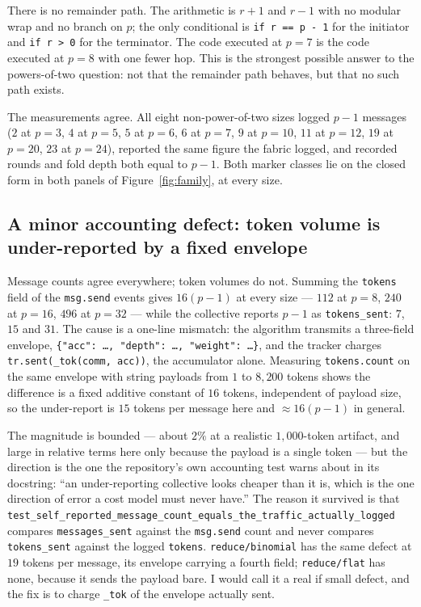 \documentclass[11pt]{article}
\begin{document}
There is no remainder path. The arithmetic is $r+1$ and $r-1$ with no modular wrap and no
branch on $p$; the only conditional is \texttt{if r == p - 1} for the initiator and
\texttt{if r > 0} for the terminator. The code executed at $p=7$ is the code executed at $p=8$
with one fewer hop. This is the strongest possible answer to the powers-of-two question: not
that the remainder path behaves, but that no such path exists.

The measurements agree. All eight non-power-of-two sizes logged $p-1$ messages ($2$ at $p=3$,
$4$ at $p=5$, $5$ at $p=6$, $6$ at $p=7$, $9$ at $p=10$, $11$ at $p=12$, $19$ at $p=20$, $23$ at
$p=24$), reported the same figure the fabric logged, and recorded rounds and fold depth both
equal to $p-1$. Both marker classes lie on the closed form in both panels of
Figure~\ref{fig:family}, at every size.

\subsection*{A minor accounting defect: token volume is under-reported by a fixed envelope}

Message counts agree everywhere; token volumes do not. Summing the \texttt{tokens} field of the
\texttt{msg.send} events gives $16(p-1)$ at every size --- $112$ at $p=8$, $240$ at $p=16$,
$496$ at $p=32$ --- while the collective reports $p-1$ as \texttt{tokens\_sent}: $7$, $15$ and
$31$. The cause is a one-line mismatch: the algorithm transmits a three-field envelope,
\texttt{\{"acc": \dots, "depth": \dots, "weight": \dots\}}, and the tracker charges
\texttt{tr.sent(\_tok(comm, acc))}, the accumulator alone. Measuring
\texttt{tokens.count} on the same envelope with string payloads from $1$ to $8{,}200$ tokens
shows the difference is a fixed additive constant of $16$ tokens, independent of payload size,
so the under-report is $15$ tokens per message here and $\approx 16(p-1)$ in general.

The magnitude is bounded --- about $2\%$ at a realistic $1{,}000$-token artifact, and large in
relative terms here only because the payload is a single token --- but the direction is the one
the repository's own accounting test warns about in its docstring: ``an under-reporting
collective looks cheaper than it is, which is the one direction of error a cost model must never
have.'' The reason it survived is that
\texttt{test\_self\_reported\_message\_count\_equals\_the\_traffic\_actually\_logged} compares
\texttt{messages\_sent} against the \texttt{msg.send} count and never compares
\texttt{tokens\_sent} against the logged \texttt{tokens}. \texttt{reduce/binomial} has the same
defect at $19$ tokens per message, its envelope carrying a fourth field; \texttt{reduce/flat}
has none, because it sends the payload bare. I would call it a real if small defect, and the fix
is to charge \texttt{\_tok} of the envelope actually sent.
\end{document}
